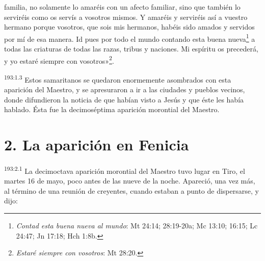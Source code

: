 familia, no solamente lo amaréis con un afecto familiar, sino que también lo serviréis como os servís a vosotros mismos. Y amaréis y serviréis así a vuestro hermano porque vosotros, que sois mis hermanos, habéis sido amados y servidos por mí de esa manera. Id pues por todo el mundo contando esta buena nueva\footnote{\textit{Contad esta buena nueva al mundo}: Mt 24:14; 28:19-20a; Mc 13:10; 16:15; Lc 24:47; Jn 17:18; Hch 1:8b.} a todas las criaturas de todas las razas, tribus y naciones. Mi espíritu os precederá, y yo estaré siempre con vosotros»\footnote{\textit{Estaré siempre con vosotros}: Mt 28:20.}.

\par 
\textsuperscript{193:1.3} Estos samaritanos se quedaron enormemente asombrados con esta aparición del Maestro, y se apresuraron a ir a las ciudades y pueblos vecinos, donde difundieron la noticia de que habían visto a Jesús y que éste les había hablado. Ésta fue la decimoséptima aparición morontial del Maestro.

\section*{2. La aparición en Fenicia}
\par 
\textsuperscript{193:2.1} La decimoctava aparición morontial del Maestro tuvo lugar en Tiro, el martes 16 de mayo, poco antes de las nueve de la noche. Apareció, una vez más, al término de una reunión de creyentes, cuando estaban a punto de dispersarse, y dijo:

